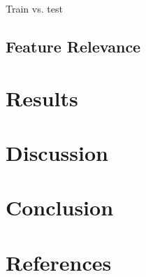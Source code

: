 \documentclass{article}
\begin{document}
	Train vs. test
	
	\subsection{Feature Relevance}
	
	\section{Results}
	
	
	
	\section{Discussion}
	
	\section{Conclusion}
	
	\section{References}
	
	\cite{radioactivedecay2}
	\cite{DLS1}  

	
\printbibliography
\end{document}
